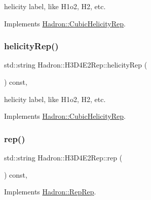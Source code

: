 helicity label, like H1o2, H2, etc. 

Implements \mbox{\hyperlink{structHadron_1_1CubicHelicityRep_af1096946b7470edf0a55451cc662f231}{Hadron\+::\+Cubic\+Helicity\+Rep}}.

\mbox{\label{structHadron_1_1H3D4E2Rep_a9b041630539536a249a5a6cae0fdb0d4}} 
\subsubsection{\texorpdfstring{helicityRep()}{helicityRep()}\hspace{0.1cm}{\footnotesize\ttfamily [2/2]}}
{\footnotesize\ttfamily std\+::string Hadron\+::\+H3\+D4\+E2\+Rep\+::helicity\+Rep (\begin{DoxyParamCaption}{ }\end{DoxyParamCaption}) const\hspace{0.3cm}{\ttfamily [inline]}, {\ttfamily [virtual]}}

helicity label, like H1o2, H2, etc. 

Implements \mbox{\hyperlink{structHadron_1_1CubicHelicityRep_af1096946b7470edf0a55451cc662f231}{Hadron\+::\+Cubic\+Helicity\+Rep}}.

\mbox{\label{structHadron_1_1H3D4E2Rep_ab0cffc17ffd30d135328751bad30c549}} 
\subsubsection{\texorpdfstring{rep()}{rep()}\hspace{0.1cm}{\footnotesize\ttfamily [1/3]}}
{\footnotesize\ttfamily std\+::string Hadron\+::\+H3\+D4\+E2\+Rep\+::rep (\begin{DoxyParamCaption}{ }\end{DoxyParamCaption}) const\hspace{0.3cm}{\ttfamily [inline]}, {\ttfamily [virtual]}}



Implements \mbox{\hyperlink{structHadron_1_1RepRep_ab3213025f6de249f7095892109575fde}{Hadron\+::\+Rep\+Rep}}.

\mbox{\label{structHadron_1_1H3D4E2Rep_ab0cffc17ffd30d135328751bad30c549}} 
